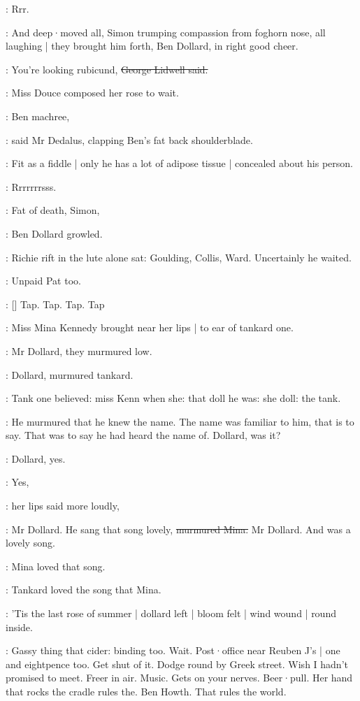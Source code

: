 :
Rrr.

:
And deep·moved all,
Simon trumping compassion from foghorn nose,
all laughing |
they brought him forth,
Ben Dollard,
in right good cheer.

\lidwell:
You're looking rubicund,
\sout{George Lidwell said.}

:
Miss Douce composed her rose to wait.

\simon:
Ben machree,

:
said Mr Dedalus,
clapping Ben's fat back shoulderblade.

\simon:
Fit as a fiddle |
only he has a lot of adipose tissue |
concealed about his person.

:
Rrrrrrrsss.

\dollard:
Fat of death,
Simon,

:
Ben Dollard growled.

:
Richie rift in the lute alone sat:
Goulding,
Collis,
Ward.
Uncertainly he waited.

:
Unpaid Pat too.

\stripling:
[]
Tap.
Tap.
Tap.
Tap

:
Miss Mina Kennedy brought near her lips |
to ear of tankard one.

:
Mr Dollard,
they murmured low.

:
Dollard,
murmured tankard.

:
Tank one believed:
miss Kenn when she:
that doll he was:
she doll:
the tank.

:
He murmured that he knew the name.
The name was familiar to him,
that is to say.
That was to say he had heard the name of.
Dollard,
was it?

:
Dollard,
yes.

\MissK:
Yes,

:
her lips said more loudly,

\MissK:
Mr Dollard.
He sang that song lovely,
\sout{murmured Mina.}
Mr Dollard.
And  was a lovely song.

:
Mina loved that song.

:
Tankard loved the song that Mina.

:
'Tis the last rose of summer |
dollard left |
bloom felt |
wind wound |
round inside.

\BloomIntA:
Gassy thing that cider:
binding too.
Wait.
Post·office near Reuben J's |
one and eightpence too.
Get shut of it.
Dodge round by Greek street.
Wish I hadn't promised to meet.
Freer in air.
Music.
Gets on your nerves.
Beer·pull.
Her hand that rocks the cradle rules the.
Ben Howth.
That rules
the world.

